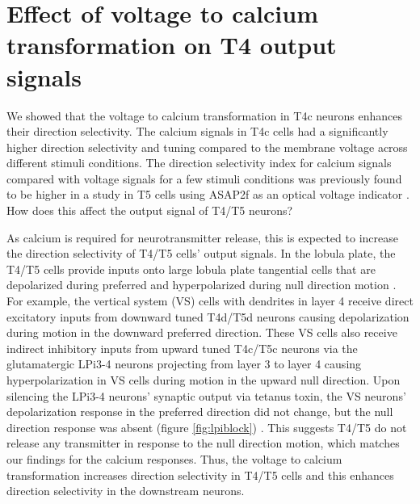 \section{Effect of voltage to calcium transformation on T4 output signals}
We showed that the voltage to calcium transformation in T4c neurons enhances their direction selectivity. The calcium signals in T4c cells had a significantly higher direction selectivity and tuning compared to the membrane voltage across different stimuli conditions. The direction selectivity index for calcium signals compared with voltage signals for a few stimuli conditions was previously found to be higher in a study in T5 cells using ASAP2f as an optical voltage indicator \parencite{Wienecke2018}. How does this affect the output signal of T4/T5 neurons?

As calcium is required for neurotransmitter release, this is expected to increase the direction selectivity of T4/T5 cells' output signals. In the lobula plate, the T4/T5 cells provide inputs onto large lobula plate tangential cells that are depolarized during preferred and hyperpolarized during null direction motion \parencite{Mauss2014}. For example, the vertical system (VS) cells with dendrites in layer 4 receive direct excitatory inputs from downward tuned T4d/T5d neurons causing depolarization during motion in the downward preferred direction. These VS cells also receive indirect inhibitory inputs from upward tuned T4c/T5c neurons via the glutamatergic LPi3-4 neurons projecting from layer 3 to layer 4 causing hyperpolarization in VS cells during motion in the upward null direction. Upon silencing the LPi3-4 neurons’ synaptic output via tetanus toxin, the VS neurons' depolarization response in the preferred direction did not change, but the null direction response was absent (figure \ref{fig:lpiblock}) \parencite{Mauss2015}. This suggests T4/T5 do not release any transmitter in response to the null direction motion, which matches our findings for the calcium responses. Thus, the voltage to calcium transformation increases direction selectivity in T4/T5 cells and this enhances direction selectivity in the downstream neurons. 

